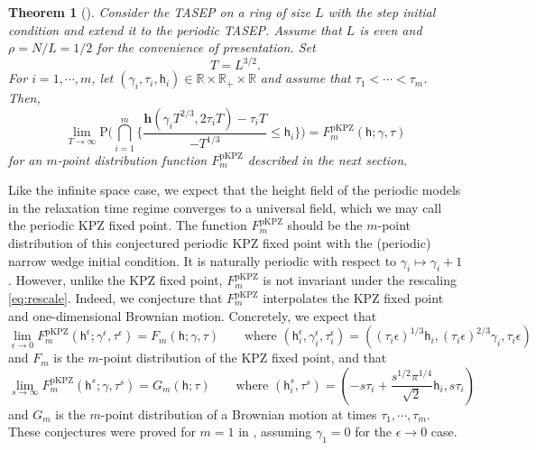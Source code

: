 \documentclass[10pt]{article}
\theoremstyle{plain}
\newtheorem{theorem}{Theorem}[section]
\theoremstyle{definition}
\newcommand{\beqq}{ \begin{equation*} }
\newcommand{\eeqq}{ \end{equation*} }
\newcommand{\dd}{\mathrm{d}}
\newcommand{\R}{\mathbb{R}}
\newcommand{\Prob}{\mathrm{P}}    %
\newcommand{\pkmath}{\mathsf}  %
\newcommand{\pkFdist}{F^{\mathrm{pKPZ}}} %
\newcommand{\pkt}{\tau} %
\newcommand{\pkga}{\gamma} %
\newcommand{\pkh}{\pkmath{h}}  %
\newcommand{\pkheight}{\mathbf{h}}
\newcommand{\ptap}{x}  %
\newcommand{\ptat}{t}  %
\newcommand{\ptah}{h}  %
\newcommand{\kFdist}{F} %
\numberwithin{equation}{section}
\begin{document}
\begin{theorem}[\cite{Baik-Liu19}] \label{thm:PTASEP}
Consider the TASEP on a ring of size $L$ with the step initial condition and extend it to the periodic TASEP. 
Assume that $L$ is even and $\rho=N/L= 1/2$ for the convenience of presentation. 
Set 
\beqq
	T=L^{3/2}. 
\eeqq
For $i=1, \cdots, m$, let 
 $(\pkga_i,  \pkt_i, \pkh_i) \in \R \times  \R_+\times \R$ and assume that $\pkt_1<\cdots< \pkt_m$. 
Then, %
\beqq
	\lim_{T\to \infty} \Prob \Big( \bigcap_{i=1}^m  \big\{  \frac{\pkheight(\pkga_i T^{2/3}, 2 \pkt_i T) - \pkt_i T}{-T^{1/3}} \le \pkh_i   \big\} \Big) 
	=   \pkFdist_m(\pkh; \pkga, \pkt)
\eeqq
for an $m$-point distribution function $\pkFdist_m$ described in the next section. 
\end{theorem}

Like the infinite space case, we expect that the height field of the periodic models in the relaxation time regime converges to a universal field, which we may call the periodic KPZ fixed point. 
The function $\pkFdist_m$ should be the $m$-point distribution of this conjectured periodic KPZ fixed point with the (periodic) narrow wedge initial condition. 
It is naturally periodic with respect to $\pkga_i\mapsto \pkga_i+1$. 
However, unlike the KPZ fixed point, $\pkFdist_m$ is not invariant under the rescaling \eqref{eq:rescale}. 
Indeed, we conjecture that $\pkFdist_m$ interpolates the KPZ fixed point and one-dimensional Brownian motion. Concretely, we expect that  
\beqq
	 \lim_{\epsilon\to 0} \pkFdist_m(\pkh^\epsilon; \pkga^\epsilon, \pkt^\epsilon) =  \kFdist_m(\pkh; \pkga, \pkt) 
	 \qquad \text{where $(\pkh_i^\epsilon, \pkga_i^\epsilon, \pkt_i^\epsilon) = ( (\pkt_i \epsilon)^{1/3}\pkh_i, (\pkt_i \epsilon)^{2/3} \pkga_i,  \pkt_i \epsilon)$} 
\eeqq
and $\kFdist_m$ is the $m$-point distribution of the KPZ fixed point, and that 
\beqq
	\lim_{s\to \infty} \pkFdist_m ( \pkh^s; \pkga,  \pkt^s  )  = G_m(\pkh; \pkt) %
	\qquad \text{where $( \pkh_i^s, \pkt^s) = ( - s \pkt_i + \frac{s^{1/2} \pi^{1/4} }{\sqrt{2}} \pkh_i, s \pkt_i)$ }
\eeqq
and $G_m$ is the $m$-point distribution of a Brownian motion at times $\pkt_1, \cdots, \pkt_m$. 
These conjectures were proved for $m=1$ in \cite{Baik-Liu-Silva20}, assuming $\pkga_1=0$ for the $\epsilon\to 0$ case. 
\end{document}
